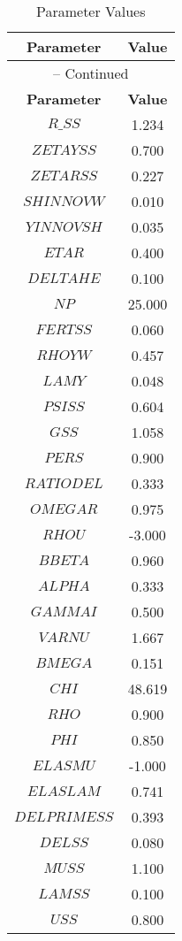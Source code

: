 \begin{center}
\begin{longtable}{cc}
\caption{Parameter Values}\\%
\toprule%
\multicolumn{1}{c}{\textbf{Parameter}} &
\multicolumn{1}{c}{\textbf{Value}}  \\%
\midrule%
\endfirsthead
\multicolumn{2}{c}{{\tablename} \thetable{} -- Continued}\\%
\midrule%
\multicolumn{1}{c}{\textbf{Parameter}} &
\multicolumn{1}{c}{\textbf{Value}} \\%
\midrule%
\endhead
$R\_SS$ 	 & 	 1.234 \\
$ZETAYSS$ 	 & 	 0.700 \\
$ZETARSS$ 	 & 	 0.227 \\
$SHINNOVW$ 	 & 	 0.010 \\
$YINNOVSH$ 	 & 	 0.035 \\
$ETAR$ 	 & 	 0.400 \\
$DELTAHE$ 	 & 	 0.100 \\
$NP$ 	 & 	 25.000 \\
$FERTSS$ 	 & 	 0.060 \\
$RHOYW$ 	 & 	 0.457 \\
$LAMY$ 	 & 	 0.048 \\
$PSISS$ 	 & 	 0.604 \\
$GSS$ 	 & 	 1.058 \\
$PERS$ 	 & 	 0.900 \\
$RATIODEL$ 	 & 	 0.333 \\
$OMEGAR$ 	 & 	 0.975 \\
$RHOU$ 	 & 	 -3.000 \\
$BBETA$ 	 & 	 0.960 \\
$ALPHA$ 	 & 	 0.333 \\
$GAMMAI$ 	 & 	 0.500 \\
$VARNU$ 	 & 	 1.667 \\
$BMEGA$ 	 & 	 0.151 \\
$CHI$ 	 & 	 48.619 \\
$RHO$ 	 & 	 0.900 \\
$PHI$ 	 & 	 0.850 \\
$ELASMU$ 	 & 	 -1.000 \\
$ELASLAM$ 	 & 	 0.741 \\
$DELPRIMESS$ 	 & 	 0.393 \\
$DELSS$ 	 & 	 0.080 \\
$MUSS$ 	 & 	 1.100 \\
$LAMSS$ 	 & 	 0.100 \\
$USS$ 	 & 	 0.800 \\

\end{longtable}
\end{center}
